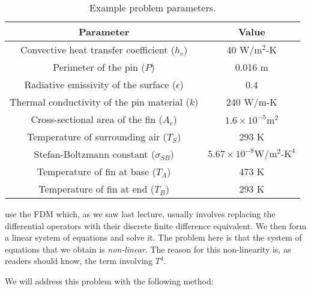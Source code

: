 \begin{table}
\begin{tabular}{|c|c|}
\hline
\textbf{Parameter} & \textbf{Value} \\ \hline
Convective heat transfer coefficient ($h_c$) & 40 $\text{W}/\text{m}^2\text{-K}$ \\ \hline
Perimeter of the pin ($P$) & 0.016 m \\ \hline
Radiative emissivity of the surface ($\epsilon$) & 0.4 \\ \hline
Thermal conductivity of the pin material ($k$) & 240 $\text{W}/\text{m-K}$ \\ \hline
Cross-sectional area of the fin ($A_c$) & $1.6 \times 10^{-5} \text{m}^2$ \\ \hline
Temperature of surrounding air ($T_S$) & 293 K \\ \hline
Stefan-Boltzmann constant ($\sigma_{SB}$) & $5.67 \times 10^{-8} \text{W}/\text{m}^2\text{-K}^4$ \\ \hline
Temperature of fin at base ($T_A$) & 473 K \\ \hline
Temperature of fin at end ($T_B$) & 293 K \\ \hline
\end{tabular}
\caption{Example problem parameters.}
\label{tab:lec31n-ex1-parameters}
\end{table}

 use the FDM which, as we saw last lecture, usually involves replacing the differential operators with their discrete finite difference equivalent.  We then form a linear system of equations and solve it.  The problem here is that the system of equations that we obtain is \emph{non-linear}.  The reason for this non-linearity is, as readers should know, the term involving $T^4$.

We will address this problem with the following method:

